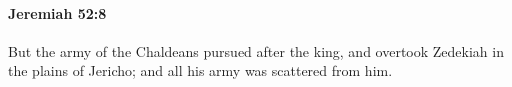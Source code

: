 
		\paragraph{Jeremiah 52:8} %
			\label{JEREMIAH-52-8}

			But the army of the Chaldeans pursued after the king, and overtook Zedekiah in the plains of Jericho; and all his army was scattered from him.


